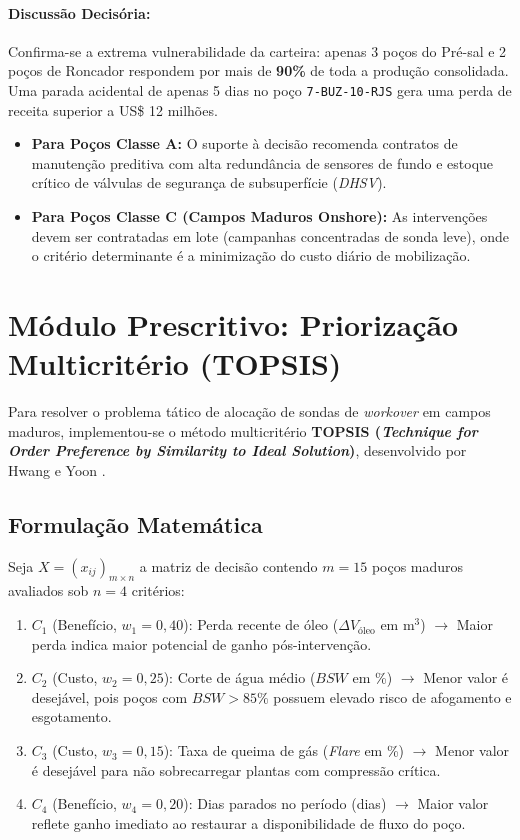 \documentclass[12pt,a4paper]{article}
\begin{document}
\paragraph{Discussão Decisória:} Confirma-se a extrema vulnerabilidade da carteira: apenas 3 poços do Pré-sal e 2 poços de Roncador respondem por mais de \textbf{90\%} de toda a produção consolidada. Uma parada acidental de apenas 5 dias no poço \texttt{7-BUZ-10-RJS} gera uma perda de receita superior a US\$ 12 milhões.
\begin{itemize}[leftmargin=*]
    \item \textbf{Para Poços Classe A:} O suporte à decisão recomenda contratos de manutenção preditiva com alta redundância de sensores de fundo e estoque crítico de válvulas de segurança de subsuperfície (\textit{DHSV}).
    \item \textbf{Para Poços Classe C (Campos Maduros Onshore):} As intervenções devem ser contratadas em lote (campanhas concentradas de sonda leve), onde o critério determinante é a minimização do custo diário de mobilização.
\end{itemize}

\section{Módulo Prescritivo: Priorização Multicritério (TOPSIS)}

Para resolver o problema tático de alocação de sondas de \textit{workover} em campos maduros, implementou-se o método multicritério \textbf{TOPSIS (\textit{Technique for Order Preference by Similarity to Ideal Solution})}, desenvolvido por Hwang e Yoon \cite{hwang1981}.

\subsection{Formulação Matemática}
Seja $X = (x_{ij})_{m \times n}$ a matriz de decisão contendo $m=15$ poços maduros avaliados sob $n=4$ critérios:
\begin{enumerate}
    \item $C_1$ (Benefício, $w_1 = 0,40$): Perda recente de óleo ($\Delta V_{\text{óleo}}$ em $\text{m}^3$) $\rightarrow$ Maior perda indica maior potencial de ganho pós-intervenção.
    \item $C_2$ (Custo, $w_2 = 0,25$): Corte de água médio ($BSW$ em \%) $\rightarrow$ Menor valor é desejável, pois poços com $BSW > 85\%$ possuem elevado risco de afogamento e esgotamento.
    \item $C_3$ (Custo, $w_3 = 0,15$): Taxa de queima de gás (\textit{Flare} em \%) $\rightarrow$ Menor valor é desejável para não sobrecarregar plantas com compressão crítica.
    \item $C_4$ (Benefício, $w_4 = 0,20$): Dias parados no período (dias) $\rightarrow$ Maior valor reflete ganho imediato ao restaurar a disponibilidade de fluxo do poço.
\end{enumerate}
\end{document}
